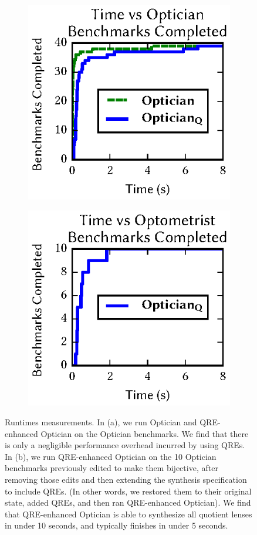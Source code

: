 \documentclass[acmsmall,review,anonymous]{acmart}
\newcommand{\QOpt}{QRE-enhanced Optician}
\begin{document}
\begin{figure}[t]
\centering
\begin{subfigure}[b]{.49\textwidth}
\centering
\includegraphics{generated-graphs/times_opt}
\caption{}
\label{subfig:lenssize}
\end{subfigure}
\begin{subfigure}[b]{.49\textwidth}
\includegraphics{generated-graphs/times_new.eps}
\caption{}
\label{subfig:examplesused}
\end{subfigure}
\caption{Runtimes measurements. In (a), we run Optician and \QOpt{}
  on the Optician benchmarks.  We find that there is only a negligible
  performance overhead incurred by using QREs. 
  In (b), we run \QOpt{} on the 10 Optician benchmarks
  previously edited to make them bijective, after removing those edits
  and then extending the synthesis specification to include QREs.
  (In other words, we restored them to their original state, added QREs,
  and then ran \QOpt{}). 
  We find that \QOpt{} is able to
  synthesize all quotient lenses in under 10 seconds, and typically finishes in
  under 5 seconds.}
\label{fig:times}
\end{figure}
\end{document}
